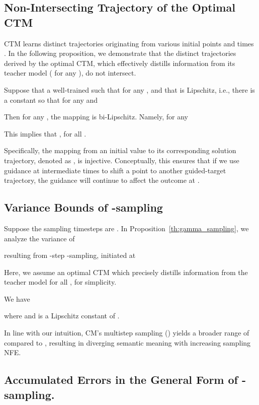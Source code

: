 \documentclass{article} \usepackage{iclr2024_coNFErence,times}
\theoremstyle{definition}
\theoremstyle{remark}
\begin{document}
\subsection{Non-Intersecting Trajectory of the Optimal CTM}\label{sec:non_intersect}
CTM learns distinct trajectories originating from various initial points  and times . In the following proposition, we demonstrate that the distinct trajectories derived by the optimal CTM, which effectively distills information from its teacher model ( for any ), do not intersect.


\begin{proposition}\label{th:gt_injective}
Suppose that a well-trained  such that  for any , and that  is Lipschitz, i.e., there is a constant 
so that for any  and 


Then for any , the mapping  is bi-Lipschitz. Namely, for any 
    
    This implies that ,  for all . 
\end{proposition}

Specifically, the mapping from an initial value to its corresponding solution trajectory, denoted as , is injective. Conceptually, this ensures that if we use guidance at intermediate times to shift a point to another guided-target trajectory, the guidance will continue to affect the outcome at .

\subsection{Variance Bounds of -sampling}\label{sec:var_bound}

Suppose the sampling timesteps are . In Proposition~\ref{th:gamma_sampling}, we analyze the variance of 

 resulting from -step -sampling, initiated at 

Here, we assume an optimal CTM which precisely distills information from the teacher model  for all , for simplicity.
\begin{proposition}\label{th:gamma_sampling}
We have
    
    where  and  is a Lipschitz constant of .
\end{proposition}

In line with our intuition, CM's multistep sampling () yields a broader range of  compared to , resulting in diverging semantic meaning with increasing sampling NFE. 


\subsection{Accumulated Errors in the General Form of -sampling.}\label{sec:acc_error}
\end{document}
